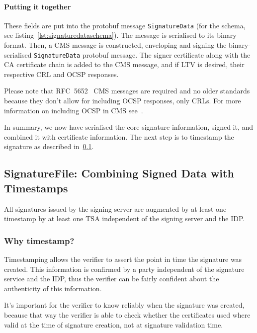 \paragraph{Putting it together}

These fields are put into the protobuf message \texttt{SignatureData} (for the schema, see listing~\ref{lst:signaturedataschema}).
The message is serialised to its binary format.
Then, a \gls{CMS} message is constructed, enveloping and signing the binary-serialised \texttt{SignatureData} protobuf message.
The signer certificate along with the \gls{CA} certificate chain is added to the \gls{CMS} message, and if \gls{LTV} is desired,
their respective \gls{CRL} and \gls{OCSP} responses.

Please note that RFC~5652~\cite{rfc5652} \gls{CMS} messages are required and no older standards
because they don't allow for including \gls{OCSP} responses, only \gls{CRL}s.
For more information on including \gls{OCSP} in \gls{CMS} see~\cite[Section 10.2.1, RevocationInfoChoices and OtherRevocationInfoFormat]{rfc5652}.

In summary, we now have serialised the core signature information, signed it, and combined it with certificate information.
The next step is to timestamp the signature as described in~\ref{subsec:signaturefile:-combining-signed-data-with-timestamps}.

\subsection{SignatureFile: Combining Signed Data with Timestamps}\label{subsec:signaturefile:-combining-signed-data-with-timestamps}
All signatures issued by the signing server are augmented by at least one timestamp by at least one \gls{TSA} independent of the signing server and the \gls{IDP}.

\subsubsection{Why timestamp?}
Timestamping allows the verifier to assert the point in time the signature was created.
This information is confirmed by a party independent of the signature service and the \gls{IDP},
thus the verifier can be fairly confident about the authenticity of this information.

It's important for the verifier to know reliably when the signature was created,
because that way the verifier is able to check whether the certificates used where valid at the time of signature creation,
not at signature validation time.

